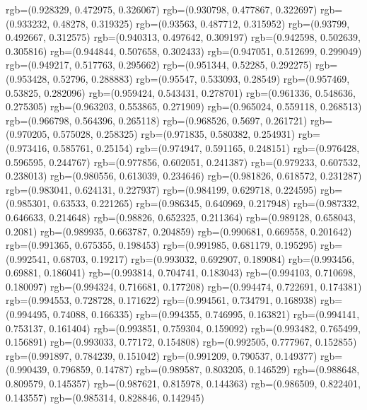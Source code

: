 {{{      rgb=(0.928329, 0.472975, 0.326067)
      rgb=(0.930798, 0.477867, 0.322697)
      rgb=(0.933232, 0.48278, 0.319325)
      rgb=(0.93563, 0.487712, 0.315952)
      rgb=(0.93799, 0.492667, 0.312575)
      rgb=(0.940313, 0.497642, 0.309197)
      rgb=(0.942598, 0.502639, 0.305816)
      rgb=(0.944844, 0.507658, 0.302433)
      rgb=(0.947051, 0.512699, 0.299049)
      rgb=(0.949217, 0.517763, 0.295662)
      rgb=(0.951344, 0.52285, 0.292275)
      rgb=(0.953428, 0.52796, 0.288883)
      rgb=(0.95547, 0.533093, 0.28549)
      rgb=(0.957469, 0.53825, 0.282096)
      rgb=(0.959424, 0.543431, 0.278701)
      rgb=(0.961336, 0.548636, 0.275305)
      rgb=(0.963203, 0.553865, 0.271909)
      rgb=(0.965024, 0.559118, 0.268513)
      rgb=(0.966798, 0.564396, 0.265118)
      rgb=(0.968526, 0.5697, 0.261721)
      rgb=(0.970205, 0.575028, 0.258325)
      rgb=(0.971835, 0.580382, 0.254931)
      rgb=(0.973416, 0.585761, 0.25154)
      rgb=(0.974947, 0.591165, 0.248151)
      rgb=(0.976428, 0.596595, 0.244767)
      rgb=(0.977856, 0.602051, 0.241387)
      rgb=(0.979233, 0.607532, 0.238013)
      rgb=(0.980556, 0.613039, 0.234646)
      rgb=(0.981826, 0.618572, 0.231287)
      rgb=(0.983041, 0.624131, 0.227937)
      rgb=(0.984199, 0.629718, 0.224595)
      rgb=(0.985301, 0.63533, 0.221265)
      rgb=(0.986345, 0.640969, 0.217948)
      rgb=(0.987332, 0.646633, 0.214648)
      rgb=(0.98826, 0.652325, 0.211364)
      rgb=(0.989128, 0.658043, 0.2081)
      rgb=(0.989935, 0.663787, 0.204859)
      rgb=(0.990681, 0.669558, 0.201642)
      rgb=(0.991365, 0.675355, 0.198453)
      rgb=(0.991985, 0.681179, 0.195295)
      rgb=(0.992541, 0.68703, 0.19217)
      rgb=(0.993032, 0.692907, 0.189084)
      rgb=(0.993456, 0.69881, 0.186041)
      rgb=(0.993814, 0.704741, 0.183043)
      rgb=(0.994103, 0.710698, 0.180097)
      rgb=(0.994324, 0.716681, 0.177208)
      rgb=(0.994474, 0.722691, 0.174381)
      rgb=(0.994553, 0.728728, 0.171622)
      rgb=(0.994561, 0.734791, 0.168938)
      rgb=(0.994495, 0.74088, 0.166335)
      rgb=(0.994355, 0.746995, 0.163821)
      rgb=(0.994141, 0.753137, 0.161404)
      rgb=(0.993851, 0.759304, 0.159092)
      rgb=(0.993482, 0.765499, 0.156891)
      rgb=(0.993033, 0.77172, 0.154808)
      rgb=(0.992505, 0.777967, 0.152855)
      rgb=(0.991897, 0.784239, 0.151042)
      rgb=(0.991209, 0.790537, 0.149377)
      rgb=(0.990439, 0.796859, 0.14787)
      rgb=(0.989587, 0.803205, 0.146529)
      rgb=(0.988648, 0.809579, 0.145357)
      rgb=(0.987621, 0.815978, 0.144363)
      rgb=(0.986509, 0.822401, 0.143557)
      rgb=(0.985314, 0.828846, 0.142945)
}}}
